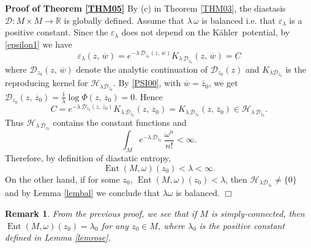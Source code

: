 \documentclass[reqno]{amsart}
\newtheorem{rmk}[thm]{Remark}
\begin{document}
\noindent
{\bf Proof of Theorem \ref{THM05}}
\noindent
By (c) in Theorem \ref{THM03}, the diastasis ${\mathcal{D}}: M \times M {\rightarrow} {\mathbb{R}}$ is globally defined. Assume that ${\lambda}\, \omega$ is balanced i.e. that ${{\varepsilon}}_{\lambda}$ is a positive constant. Since the ${{\varepsilon}}_{\lambda}$ does not depend on the {K\"{a}hler}\ potential, by \eqref{epsilon1} we have
\begin{equation}\label{epsilon2}
{{\varepsilon}}_{\lambda}\left( z,\, {\overline{w}}\right)=e^{-{\lambda}\,{\mathcal{D}}_{z_0}\left( z,\, {\overline{w}}\right)}K_{{\lambda}\,{\mathcal{D}}_{z_0}}\left( z,\, {\overline{w}}\right)=C
\end{equation}
where ${\mathcal{D}}_{z_0}\left( z,\, {\overline{w}}\right)$ denote the analytic continuation of ${\mathcal{D}}_{z_0}\left( z\right)$ and $K_{{\lambda}{\mathcal{D}}_{z_0}}$ is the reproducing kernel for ${\mathcal{H}}_{{\lambda}{\mathcal{D}}_{z_0}}$. By \eqref{PSI00}, with ${\overline{w}} = {\overline{z}}_0$, we get ${\mathcal{D}}_{z_0}\left( z,\, {\overline{z}}_0\right)= \frac{1}{\lambda} \log\Phi\left( z,\,{\overline{z}}_0\right)=0$. Hence
\begin{equation*}
C= e^{-{\lambda}\,{\mathcal{D}}_{z_0}\left( z,\, {\overline{z}}_0\right)} K_{{\lambda}\,{\mathcal{D}}_{z_0}}\left( z,\, {\overline{z}}_0\right)=K_{{\lambda}\,{\mathcal{D}}_{z_0}}\left( z,\, {\overline{z}}_0\right)  \in {\mathcal{H}}_{{\lambda}\,{\mathcal{D}}_{z_0}}.
\end{equation*}
Thus ${\mathcal{H}}_{{{\lambda}\,{\mathcal{D}}_{z_0}}}$ contains the constant functions and
\[
\int_M e^{-{\lambda}\,{\mathcal{D}}_{z_0}}\ \frac{\omega^n}{n!}<\infty.
\]
Therefore, by definition of diastatic entropy, 
\[
{\operatorname{Ent}} \left( M ,\omega\right)\left( z_0 \right) <{\lambda}<\infty.
\]
On the other hand, if for some $z_0$, ${\operatorname{Ent}} \left( M,\omega\right)(z_0)<{\lambda}$, then ${\mathcal{H}}_{{\lambda}{\mathcal{D}}_{z_0}}\not =\lbrace 0 \rbrace$ and by Lemma \ref{lembal} we conclude that ${\lambda} \omega$ is balanced. {\hspace*{\fill}$\Box$}

\begin{rmk}\rm
From the previous proof, we see that if $M$ is simply-connected, then ${\operatorname{Ent}}(M, \omega)(z_0) = {\lambda}_0$ for any $z_0 \in M$, where ${\lambda}_0$ is the positive constant defined in Lemma \ref{lemrose}. 
\end{rmk}
\end{document}
